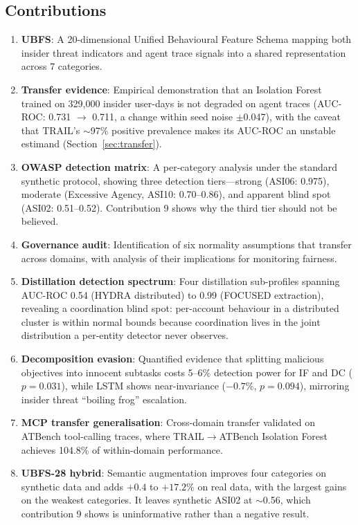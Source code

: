 \documentclass[conference]{IEEEtran}
\begin{document}
\subsection{Contributions}

\begin{enumerate}
    \item \textbf{UBFS}: A 20-dimensional Unified Behavioural Feature Schema mapping both insider threat indicators and agent trace signals into a shared representation across 7 categories.
    \item \textbf{Transfer evidence}: Empirical demonstration that an Isolation Forest trained on 329,000 insider user-days is not degraded on agent traces (AUC-ROC: 0.731 $\to$ 0.711, a change within seed noise $\pm$0.047), with the caveat that TRAIL's ${\sim}$97\% positive prevalence makes its AUC-ROC an unstable estimand (Section~\ref{sec:transfer}).
    \item \textbf{OWASP detection matrix}: A per-category analysis under the standard synthetic protocol, showing three detection tiers---strong (ASI06: 0.975), moderate (Excessive Agency, ASI10: 0.70--0.86), and apparent blind spot (ASI02: 0.51--0.52). Contribution 9 shows why the third tier should not be believed.
    \item \textbf{Governance audit}: Identification of six normality assumptions that transfer across domains, with analysis of their implications for monitoring fairness.
    \item \textbf{Distillation detection spectrum}: Four distillation sub-profiles spanning AUC-ROC 0.54 (HYDRA distributed) to 0.99 (FOCUSED extraction), revealing a coordination blind spot: per-account behaviour in a distributed cluster is within normal bounds because coordination lives in the joint distribution a per-entity detector never observes.
    \item \textbf{Decomposition evasion}: Quantified evidence that splitting malicious objectives into innocent subtasks costs 5--6\% detection power for IF and DC ($p{=}0.031$), while LSTM shows near-invariance ($-0.7\%$, $p{=}0.094$), mirroring insider threat ``boiling frog'' escalation.
    \item \textbf{MCP transfer generalisation}: Cross-domain transfer validated on ATBench tool-calling traces, where TRAIL$\to$ATBench Isolation Forest achieves 104.8\% of within-domain performance.
    \item \textbf{UBFS-28 hybrid}: Semantic augmentation improves four categories on synthetic data and adds $+0.4$ to $+17.2\%$ on real data, with the largest gains on the weakest categories. It leaves synthetic ASI02 at ${\sim}$0.56, which contribution 9 shows is uninformative rather than a negative result.

\end{enumerate}
\end{document}

